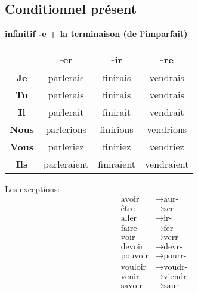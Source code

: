 \documentclass[12pt, a4paper]{article}
\begin{document}
\begin{multicols*}{3}
\subsection{Conditionnel présent}
\begin{center}
\underline{\textbf{infinitif -e + la terminaison (de l'imparfait)}}
\begin{tabular}{|c|c|c|c|}
  \hline
  & \textbf{-er} & \textbf{-ir} & \textbf{-re}\\\hline
  \textbf{Je} & parlerais & finirais & vendrais \\\hline
  \textbf{Tu} & parlerais & finirais & vendrais \\\hline
  \textbf{Il} & parlerait & finirait & vendrait \\\hline
  \textbf{Nous} & parlerions & finirions & vendrions \\\hline
  \textbf{Vous} & parleriez & finiriez & vendriez \\\hline
  \textbf{Ils} & parleraient & finiraient & vendraient \\\hline
\end{tabular}
\end{center}

Les exceptions:
\begin{align*}
  \text{avoir} &\rightarrow \text{aur-}\\ 
  \text{être} &\rightarrow \text{ser-}\\ 
  \text{aller} &\rightarrow \text{ir-}\\ 
  \text{faire} &\rightarrow \text{fer-}\\ 
  \text{voir} &\rightarrow \text{verr-}\\ 
  \text{devoir} &\rightarrow \text{devr-}\\ 
  \text{pouvoir} &\rightarrow \text{pourr-}\\ 
  \text{vouloir} &\rightarrow \text{voudr-}\\ 
  \text{venir} &\rightarrow \text{viendr-}\\ 
  \text{savoir} &\rightarrow \text{saur-}\\ 
\end{align*}


\end{multicols*}
\end{document}
